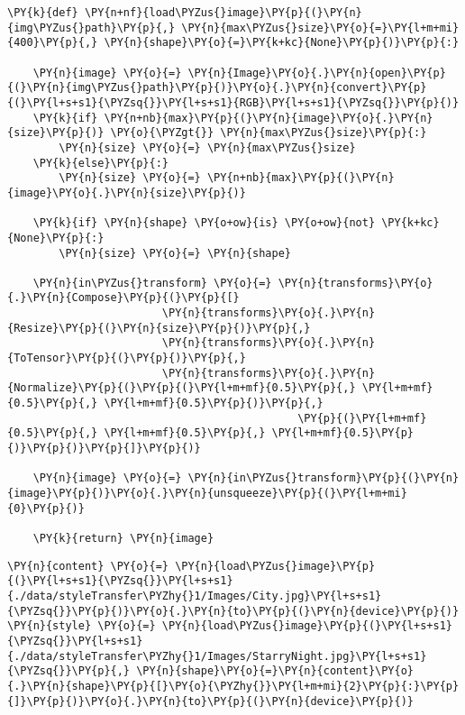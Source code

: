     \begin{tcolorbox}[breakable, size=fbox, boxrule=1pt, pad at break*=1mm,colback=cellbackground, colframe=cellborder]
\begin{Verbatim}[commandchars=\\\{\}]
\PY{k}{def} \PY{n+nf}{load\PYZus{}image}\PY{p}{(}\PY{n}{img\PYZus{}path}\PY{p}{,} \PY{n}{max\PYZus{}size}\PY{o}{=}\PY{l+m+mi}{400}\PY{p}{,} \PY{n}{shape}\PY{o}{=}\PY{k+kc}{None}\PY{p}{)}\PY{p}{:}
    
    \PY{n}{image} \PY{o}{=} \PY{n}{Image}\PY{o}{.}\PY{n}{open}\PY{p}{(}\PY{n}{img\PYZus{}path}\PY{p}{)}\PY{o}{.}\PY{n}{convert}\PY{p}{(}\PY{l+s+s1}{\PYZsq{}}\PY{l+s+s1}{RGB}\PY{l+s+s1}{\PYZsq{}}\PY{p}{)}
    \PY{k}{if} \PY{n+nb}{max}\PY{p}{(}\PY{n}{image}\PY{o}{.}\PY{n}{size}\PY{p}{)} \PY{o}{\PYZgt{}} \PY{n}{max\PYZus{}size}\PY{p}{:}
        \PY{n}{size} \PY{o}{=} \PY{n}{max\PYZus{}size}
    \PY{k}{else}\PY{p}{:}
        \PY{n}{size} \PY{o}{=} \PY{n+nb}{max}\PY{p}{(}\PY{n}{image}\PY{o}{.}\PY{n}{size}\PY{p}{)}
    
    \PY{k}{if} \PY{n}{shape} \PY{o+ow}{is} \PY{o+ow}{not} \PY{k+kc}{None}\PY{p}{:}
        \PY{n}{size} \PY{o}{=} \PY{n}{shape}
 
    \PY{n}{in\PYZus{}transform} \PY{o}{=} \PY{n}{transforms}\PY{o}{.}\PY{n}{Compose}\PY{p}{(}\PY{p}{[}
                        \PY{n}{transforms}\PY{o}{.}\PY{n}{Resize}\PY{p}{(}\PY{n}{size}\PY{p}{)}\PY{p}{,}
                        \PY{n}{transforms}\PY{o}{.}\PY{n}{ToTensor}\PY{p}{(}\PY{p}{)}\PY{p}{,}
                        \PY{n}{transforms}\PY{o}{.}\PY{n}{Normalize}\PY{p}{(}\PY{p}{(}\PY{l+m+mf}{0.5}\PY{p}{,} \PY{l+m+mf}{0.5}\PY{p}{,} \PY{l+m+mf}{0.5}\PY{p}{)}\PY{p}{,} 
                                             \PY{p}{(}\PY{l+m+mf}{0.5}\PY{p}{,} \PY{l+m+mf}{0.5}\PY{p}{,} \PY{l+m+mf}{0.5}\PY{p}{)}\PY{p}{)}\PY{p}{]}\PY{p}{)}

    \PY{n}{image} \PY{o}{=} \PY{n}{in\PYZus{}transform}\PY{p}{(}\PY{n}{image}\PY{p}{)}\PY{o}{.}\PY{n}{unsqueeze}\PY{p}{(}\PY{l+m+mi}{0}\PY{p}{)}
    
    \PY{k}{return} \PY{n}{image}
\end{Verbatim}
\end{tcolorbox}

    \begin{tcolorbox}[breakable, size=fbox, boxrule=1pt, pad at break*=1mm,colback=cellbackground, colframe=cellborder]
\begin{Verbatim}[commandchars=\\\{\}]
\PY{n}{content} \PY{o}{=} \PY{n}{load\PYZus{}image}\PY{p}{(}\PY{l+s+s1}{\PYZsq{}}\PY{l+s+s1}{./data/styleTransfer\PYZhy{}1/Images/City.jpg}\PY{l+s+s1}{\PYZsq{}}\PY{p}{)}\PY{o}{.}\PY{n}{to}\PY{p}{(}\PY{n}{device}\PY{p}{)}
\PY{n}{style} \PY{o}{=} \PY{n}{load\PYZus{}image}\PY{p}{(}\PY{l+s+s1}{\PYZsq{}}\PY{l+s+s1}{./data/styleTransfer\PYZhy{}1/Images/StarryNight.jpg}\PY{l+s+s1}{\PYZsq{}}\PY{p}{,} \PY{n}{shape}\PY{o}{=}\PY{n}{content}\PY{o}{.}\PY{n}{shape}\PY{p}{[}\PY{o}{\PYZhy{}}\PY{l+m+mi}{2}\PY{p}{:}\PY{p}{]}\PY{p}{)}\PY{o}{.}\PY{n}{to}\PY{p}{(}\PY{n}{device}\PY{p}{)}
\end{Verbatim}
\end{tcolorbox}

